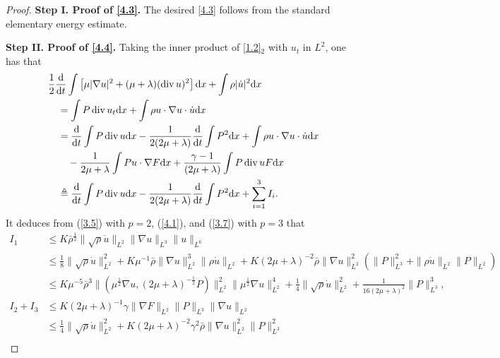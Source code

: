 \documentclass[10pt,a4paper]{amsart}
\DeclareMathOperator{\divv}{div}
\begin{document}
\begin{proof}
{\bf Step I. Proof of \eqref{4.3}.}
The desired \eqref{4.3} follows from the standard elementary energy estimate.

{\bf Step II. Proof of \eqref{4.4}.} Taking the inner product of \eqref{1.2}$_2$ with $u_t$ in $L^2$, one has that
\begin{align}\label{4.5}
& \frac{1}{2} \frac{\mathrm{d}}{\mathrm{d} t} \int \left[ \mu |\nabla u|^2 + (\mu + \lambda )(\divv u)^2 \right] \mathrm{d} x + \int \rho |\dot{u}|^2 \mathrm{d} x\nonumber\\
& \quad = \int P \divv u_t \mathrm{d} x + \int \rho u \cdot \nabla u \cdot \dot{u} \mathrm{d} x\nonumber\\
& \quad = \frac{\mathrm{d}}{\mathrm{d} t} \int P \divv u \mathrm{d} x - \frac{1}{2 (2 \mu + \lambda )} \frac{\mathrm{d}}{\mathrm{d} t} \int P^2 \mathrm{d} x + \int \rho u \cdot \nabla u \cdot \dot{u} \mathrm{d} x \notag\\
& \qquad - \frac{1}{2\mu + \lambda } \int P u \cdot \nabla F \mathrm{d} x + \frac{\gamma - 1}{ \left(2 \mu + \lambda \right)} \int P \divv u F \mathrm{d} x\nonumber\\
& \quad \triangleq \frac{\mathrm{d}}{\mathrm{d} t} \int P \divv u \mathrm{d} x - \frac{1}{2 (2 \mu + \lambda )} \frac{\mathrm{d}}{\mathrm{d} t} \int P^2 \mathrm{d} x + \sum^3_{i = 1} I_i.
\end{align}
It deduces from (\ref{3.5}) with $p = 2$, (\ref{4.1}), and (\ref{3.7}) with $p = 3$ that
\begin{align*}
I_1
& \leq K \bar{\rho}^{\frac{1}{2}} \|\sqrt{\rho} \dot{u}\|_{L^2} \|\nabla u\|_{L^3} \|u\|_{L^6} \\
& \leq \frac{1}{8} \|\sqrt{\rho} \dot{u}\|_{L^2}^2 + K \mu^{-1} \bar{\rho} \|\nabla u\|_{L^2}^3 \|\rho \dot u\|_{L^2} + K \left(2 \mu + \lambda \right)^{-2} \bar{\rho} \|\nabla u\|_{L^2}^2 \left(\|P\|_{L^3}^2 + \|\rho \dot u\|_{L^2} \|P\|_{L^2} \right)\\
& \leq K \mu^{-5} \bar{\rho}^3 \|(\mu^{\frac{1}{2}} \nabla u, \left(2\mu + \lambda \right)^{-\frac{1}{2}} P)\|_{L^2}^2 \|\mu^{\frac{1}{2}}\nabla u\|_{L^2}^4 + \frac{1}{4} \|\sqrt{\rho} \dot{u}\|_{L^2}^2 + \frac{1}{16 (2 \mu + \lambda )^2} \|P\|_{L^3}^3,\\
I_2 + I_3
& \leq K \left(2 \mu + \lambda \right)^{-1} \gamma \|\nabla F\|_{L^2} \|P\|_{L^3} \|\nabla u\|_{L^2} \\
& \leq \frac{1}{4} \|\sqrt{\rho} \dot{u}\|_{L^2}^2 + K \left(2 \mu + \lambda \right)^{-2} \gamma^2 \bar{\rho} \|\nabla u\|_{L^2}^2 \|P\|_{L^3}^2\\

\end{align*}
\end{proof}
\end{document}
